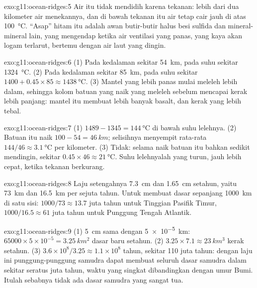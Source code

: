 \begin{solution}{exo:g11:ocean-ridges:5}
Air itu tidak mendidih karena tekanan: lebih dari dua kilometer air menekannya,
dan di bawah tekanan itu air tetap cair jauh di atas \qty{100}{\celsius}.
``Asap'' hitam itu adalah awan butir-butir halus besi sulfida dan
mineral-mineral lain, yang mengendap ketika air ventilasi yang panas, yang kaya
akan logam terlarut, bertemu dengan air laut yang dingin.
\end{solution}

\begin{solution}{exo:g11:ocean-ridges:6}
(1) Pada kedalaman sekitar \qty{54}{km}, pada suhu sekitar \qty{1324}{\celsius}.
(2) Pada kedalaman sekitar \qty{85}{km}, pada suhu sekitar
$1400 + 0.45 \times 85 \approx
\qty{1438}{\celsius}$. (3) Mantel yang lebih panas mulai meleleh lebih dalam,
sehingga kolom batuan yang naik yang meleleh sebelum mencapai kerak lebih
panjang: mantel itu membuat lebih banyak basalt, dan kerak yang lebih tebal.
\end{solution}

\begin{solution}{exo:g11:ocean-ridges:7}
(1) $1489 - 1345 = \qty{144}{\celsius}$ di bawah suhu lelehnya.
(2) Batuan itu naik $100 - 54 = \qty{46}{km}$; selisihnya menyempit rata-rata
$144/46 \approx \qty{3.1}{\celsius}$ per kilometer. (3) Tidak: selama naik batuan
itu bahkan sedikit mendingin, sekitar $0.45 \times 46 \approx
\qty{21}{\celsius}$. Suhu lelehnyalah yang turun, jauh lebih cepat, ketika
tekanan berkurang.
\end{solution}

\begin{solution}{exo:g11:ocean-ridges:8}
Laju setengahnya \qty{7.3}{cm} dan \qty{1.65}{cm} setahun, yaitu
\qty{73}{km} dan \qty{16.5}{km} per sejuta tahun. Untuk membuat dasar sepanjang
\qty{1000}{km} di satu sisi: $1000/73 \approx 13.7$ juta tahun untuk Tinggian
Pasifik Timur, $1000/16.5 \approx 61$ juta tahun untuk Punggung Tengah Atlantik.
\end{solution}

\begin{solution}{exo:g11:ocean-ridges:9}
(1) \qty{5}{cm} sama dengan \qty{5e-5}{km}: $65000 \times 5 \times 10^{-5} =
\qty{3.25}{km^2}$ dasar baru setahun. (2) $3.25 \times 7.1 \approx
\qty{23}{km^3}$ kerak setahun. (3) $3.6 \times 10^8 / 3.25 \approx 1.1
\times 10^8$ tahun, sekitar 110 juta tahun: dengan laju ini punggung-punggung
samudra dapat membuat seluruh dasar samudra dalam sekitar seratus juta tahun,
waktu yang singkat dibandingkan dengan umur Bumi. Itulah sebabnya tidak ada dasar
samudra yang sangat tua.
\end{solution}

